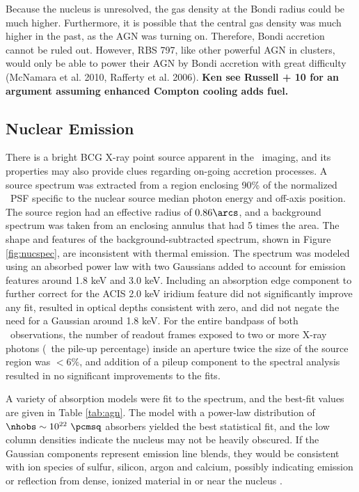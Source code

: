 \documentclass[11pt, preprint]{aastex}
\begin{document}
Because the nucleus is unresolved, the gas density at the Bondi radius
could be much higher. Furthermore, it is possible that the central
gas density was much higher in the past, as the AGN was turning on.
Therefore, Bondi accretion cannot be ruled out. However, RBS 797, like
other powerful AGN in clusters, would only be able to power their AGN
by Bondi accretion with great difficulty (McNamara et al. 2010,
Rafferty et al. 2006). {\bf Ken see Russell + 10 for an argument
  assuming enhanced Compton cooling adds fuel.}

\subsection{Nuclear Emission}
\label{sec:nuc}

There is a bright BCG X-ray point source apparent in the
\cxo\ imaging, and its properties may also provide clues regarding
on-going accretion processes. A source spectrum was extracted from a
region enclosing 90\% of the normalized \cxo\ PSF specific to the
nuclear source median photon energy and off-axis position. The source
region had an effective radius of $0.86\arcs$, and a background
spectrum was taken from an enclosing annulus that had 5 times the
area. The shape and features of the background-subtracted spectrum,
shown in Figure \ref{fig:nucspec}, are inconsistent with thermal
emission. The spectrum was modeled using an absorbed power law with
two Gaussians added to account for emission features around 1.8 keV
and 3.0 keV. Including an absorption edge component to further correct
for the ACIS 2.0 keV iridium feature did not significantly improve any
fit, resulted in optical depths consistent with zero, and did not
negate the need for a Gaussian around 1.8 keV. For the entire bandpass
of both \cxo\ observations, the number of readout frames exposed to
two or more X-ray photons (\ie\ the pile-up percentage) inside an
aperture twice the size of the source region was $< 6\%$, and addition
of a pileup component to the spectral analysis resulted in no
significant improvements to the fits.

A variety of absorption models were fit to the spectrum, and the
best-fit values are given in Table \ref{tab:agn}. The model with a
power-law distribution of $\nhobs \sim 10^{22} ~\pcmsq$ absorbers
yielded the best statistical fit, and the low column densities
indicate the nucleus may not be heavily obscured. If the Gaussian
components represent emission line blends, they would be consistent
with ion species of sulfur, silicon, argon and calcium, possibly
indicating emission or reflection from dense, ionized material in or
near the nucleus \citep[\eg][]{1990ApJ...362...90B,
  1998MNRAS.297.1219I}.
\end{document}
